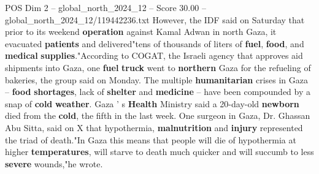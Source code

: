 \begin{textsample}{POS Dim 2 – global\_north\_2024\_12 – Score 30.00 – global\_north\_2024\_12/119442236.txt}
However, the IDF said on Saturday that prior to its weekend \textbf{operation} against Kamal Adwan in north Gaza, it evacuated \textbf{patients} and delivered"tens of thousands of liters of \textbf{fuel}, \textbf{food}, and \textbf{medical} \textbf{supplies}."According to COGAT, the Israeli agency that approves aid shipments into Gaza, one \textbf{fuel} \textbf{truck} went to \textbf{northern} Gaza for the refueling of bakeries, the group said on Monday.
The multiple \textbf{humanitarian} crises in Gaza -- \textbf{food} \textbf{shortages}, lack of \textbf{shelter} and \textbf{medicine} -- have been compounded by a snap of \textbf{cold} \textbf{weather}.
Gaza ' s \textbf{Health} Ministry said a 20-day-old \textbf{newborn} died from the \textbf{cold}, the fifth in the last week.
One surgeon in Gaza, Dr.
Ghassan Abu Sitta, said on X that hypothermia, \textbf{malnutrition} and \textbf{injury} represented the triad of death."In Gaza this means that people will die of hypothermia at higher \textbf{temperatures}, will starve to death much quicker and will succumb to less \textbf{severe} wounds,"he wrote.

\end{textsample}
